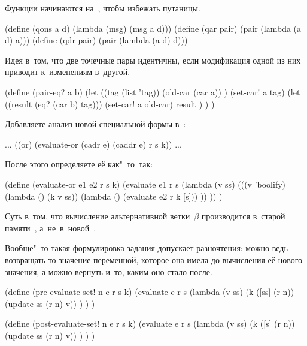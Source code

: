 
Функции начинаются на~, чтобы избежать путаницы.

\begin{code:lisp}
(define (qons a d) (lambda (msg) (msg a d)))
(define (qar pair) (pair (lambda (a d) a)))
(define (qdr pair) (pair (lambda (a d) d)))
\end{code:lisp}



Идея в~том, что две точечные пары идентичны, если модификация одной из них
приводит к~изменениям в~другой.

\begin{code:lisp}
(define (pair-eq? a b)
  (let ((tag (list 'tag))
        (old-car (car a)) )
    (set-car! a tag)
    (let ((result (eq? (car b) tag)))
      (set-car! a old-car)
      result ) ) )
\end{code:lisp}



Добавляете анализ новой специальной формы в~:

\begin{code:lisp}
...
((or) (evaluate-or (cadr e) (caddr e) r s k))
...
\end{code:lisp}

\noindent
После этого определяете её как"~то~так:

\begin{code:lisp}
(define (evaluate-or e1 e2 r s k)
  (evaluate e1 r s (lambda (v ss)
                     (((v 'boolify)
                       (lambda () (k v ss))
                       (lambda () (evaluate e2 r k [s])) )) )) )
\end{code:lisp}

Суть в~том, что вычисление альтернативной ветки~$\beta$ производится в~старой
памяти~, а~не~в~новой~.



Вообще"~то такая формулировка задания допускает разночтения: можно ведь
возвращать то значение переменной, которое она имела до вычисления её нового
значения, а можно вернуть и~то, каким оно стало после.

\begin{code:lisp}
(define (pre-evaluate-set! n e r s k)
  (evaluate e r s
    (lambda (v ss)
      (k ([ss] (r n)) (update ss (r n) v)) ) ) )

(define (post-evaluate-set! n e r s k)
  (evaluate e r s
    (lambda (v ss)
      (k ([s] (r n)) (update ss (r n) v)) ) ) )
\end{code:lisp}

